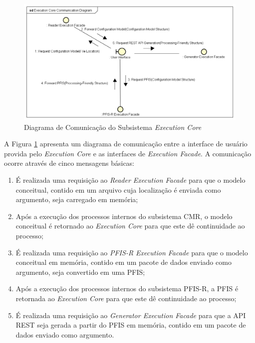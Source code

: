 \begin{figure}[htb]
    \begin{center}
        \includegraphics[scale=0.57]{imagens/Execution_Core_Communication_Diagram.png}
    \end{center}
	\caption{\label{fig_eccom}Diagrama de Comunicação do Subsistema \textit{Execution Core}}
\end{figure}

A Figura \ref{fig_eccom} apresenta um diagrama de comunicação entre a interface de usuário provida pelo \textit{Execution Core} e as interfaces de \textit{Execution Facade}. A comunicação ocorre através de cinco mensagens básicas:

\begin{enumerate}
    \item É realizada uma requisição ao \textit{Reader Execution Facade} para que o modelo conceitual, contido em um arquivo cuja localização é enviada como argumento, seja carregado em memória;
    \item Após a execução dos processos internos do subsistema CMR, o modelo conceitual é retornado ao \textit{Execution Core} para que este dê continuidade ao processo;
    \item É realizada uma requisição ao \textit{PFIS-R Execution Facade} para que o modelo conceitual em memória, contido em um pacote de dados enviado como argumento, seja convertido em uma PFIS;
    \item Após a execução dos processos internos do subsistema PFIS-R, a PFIS é retornada ao \textit{Execution Core} para que este dê continuidade ao processo;
    \item É realizada uma requisição ao \textit{Generator Execution Facade} para que a API REST seja gerada a partir do PFIS em memória, contido em um pacote de dados enviado como argumento.
\end{enumerate}

